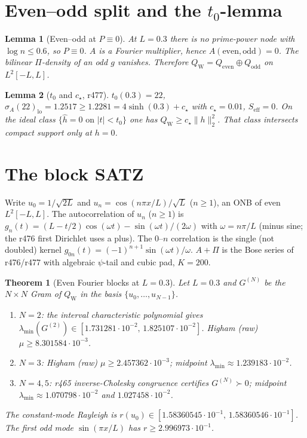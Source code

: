 \documentclass[11pt]{article}
\newtheorem{lemma}{Lemma}
\newtheorem{theorem}{Theorem}
\theoremstyle{remark}
\newcommand{\QW}{Q_{\mathrm W}}
\begin{document}
\section{Even--odd split and the $t_0$-lemma}

\begin{lemma}[Even--odd at $P\equiv0$]\label{lem:split}
At $L=0.3$ there is no prime-power node with $\log n\le 0.6$,
so $P\equiv0$.  $A$ is a Fourier multiplier, hence
$A(\mathrm{even},\mathrm{odd})=0$.  The bilinear $\Pi$-density
of an odd $g$ vanishes.  Therefore
$\QW=Q_{\mathrm{even}}\oplus Q_{\mathrm{odd}}$
on $L^2[-L,L]$.
\end{lemma}

\begin{lemma}[$t_0$ and $c_\star$, r477]\label{lem:t0}
$t_0(0.3)=22$, $\sigma_A(22)_{\mathrm{lo}}=1.2517\ge1.2281
=4\sinh(0.3)+c_\star$ with $c_\star=0.01$, $S_{\mathrm{eff}}=0$.
On the ideal class $\{\hat h=0\text{ on }|t|<t_0\}$ one has
$\QW\ge c_\star\|h\|_2^2$.  That class intersects compact
support only at $h=0$.
\end{lemma}

\section{The block SATZ}

Write $u_0=1/\sqrt{2L}$ and
$u_n=\cos(n\pi x/L)/\sqrt{L}$ ($n\ge1$),
an ONB of even $L^2[-L,L]$.
The autocorrelation of $u_n$ ($n\ge1$) is
$g_n(t)=(L-t/2)\cos(\omega t)-\sin(\omega t)/(2\omega)$
with $\omega=n\pi/L$ (minus sine; the r476 first Dirichlet
uses a plus).  The $0$--$n$ correlation is the single
(not doubled) kernel
$g_{0n}(t)=(-1)^{n+1}\sin(\omega t)/\omega$.
$A+\Pi$ is the Bose series of r476/r477 with algebraic
$\psi$-tail and cubic pad, $K=200$.

\begin{theorem}[Even Fourier blocks at $L=0.3$]\label{thm:A}
Let $L=0.3$ and $G^{(N)}$ be the $N\times N$ Gram of $\QW$
in the basis $\{u_0,\dots,u_{N-1}\}$.
\begin{enumerate}
\item $N=2$: the interval characteristic polynomial gives
$\lambda_{\min}(G^{(2)})\in[1.731281\cdot10^{-2},\,1.825107\cdot10^{-2}]$.
Higham (raw) $\mu\ge8.301584\cdot10^{-3}$.
\item $N=3$: Higham (raw) $\mu\ge2.457362\cdot10^{-3}$;
midpoint $\lambda_{\min}\approx1.239183\cdot10^{-2}$.
\item $N=4,5$: r465 inverse-Cholesky congruence certifies
$G^{(N)}\succ0$; midpoint
$\lambda_{\min}\approx1.070798\cdot10^{-2}$ and
$1.027458\cdot10^{-2}$.
\end{enumerate}
The constant-mode Rayleigh is
$r(u_0)\in[1.58360545\cdot10^{-1},\,1.58360546\cdot10^{-1}]$.
The first odd mode $\sin(\pi x/L)$ has
$r\ge2.996973\cdot10^{-1}$.
\end{theorem}
\end{document}
